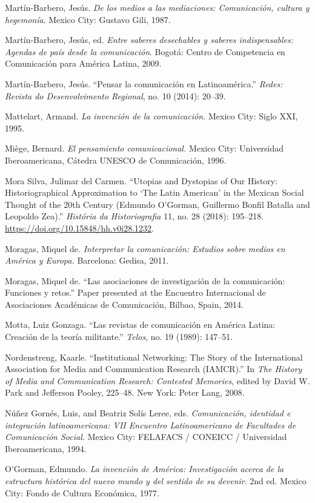 \documentclass{tufte-handout}
\begin{document}
\begin{hangparas}{.25in}{1}
Martín-Barbero, Jesús. \emph{De los medios a las mediaciones:
Comunicación, cultura y hegemonía}. Mexico City: Gustavo Gili, 1987.

Martín-Barbero, Jesús, ed. \emph{Entre saberes desechables y saberes
indispensables: Agendas de país desde la comunicación}. Bogotá: Centro
de Competencia en Comunicación para América Latina, 2009.

Martín-Barbero, Jesús. ``Pensar la comunicación en Latinoamérica.''
\emph{Redes: Revista do Desenvolvimento Regional}, no. 10 (2014):
20--39.

Mattelart, Armand. \emph{La invención de la comunicación.} Mexico City:
Siglo XXI, 1995.

Miège, Bernard. \emph{El pensamiento comunicacional.} Mexico City:
Universidad Iberoamericana, Cátedra UNESCO de Comunicación, 1996.

Mora Silva, Julimar del Carmen. ``Utopias and Dystopias of Our History:
Historiographical Approximation to `The Latin American' in the Mexican
Social Thought of the 20th Century (Edmundo O'Gorman, Guillermo Bonfil
Batalla and Leopoldo Zea).'' \emph{História da Historiografia} 11, no.
28 (2018): 195--218. \url{https://doi.org/10.15848/hh.v0i28.1232}.

Moragas, Miquel de. \emph{Interpretar la comunicación: Estudios sobre
medios en América y Europa.} Barcelona: Gedisa, 2011.

Moragas, Miquel de. ``Las asociaciones de investigación de la
comunicación: Funciones y retos.'' Paper presented at the Encuentro
Internacional de Asociaciones Académicas de Comunicación, Bilbao, Spain,
2014.

Motta, Luiz Gonzaga. ``Las revistas de comunicación en América Latina:
Creación de la teoría militante.'' \emph{Telos}, no. 19 (1989): 147--51.

Nordenstreng, Kaarle. ``Institutional Networking: The Story of the
International Association for Media and Communication Research
(IAMCR).'' In \emph{The History of Media and Communication Research:
Contested Memories}, edited by David W. Park and Jefferson Pooley,
225--48. New York: Peter Lang, 2008.

Núñez Gornés, Luis, and Beatriz Solís Leree, eds. \emph{Comunicación,
identidad e integración latinoamericana: VII Encuentro Latinoamericano
de Facultades de Comunicación Social.} Mexico City: FELAFACS / CONEICC /
Universidad Iberoamericana, 1994.

O'Gorman, Edmundo. \emph{La invención de América: Investigación acerca
de la estructura histórica del nuevo mundo y del sentido de su devenir}.
2nd ed. Mexico City: Fondo de Cultura Económica, 1977.


\end{hangparas}
\end{document}

